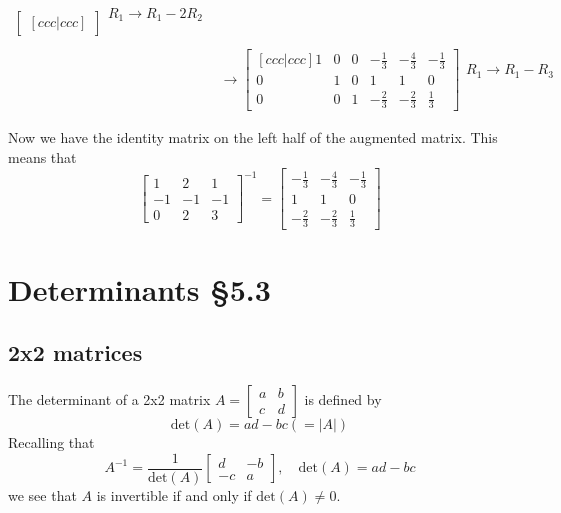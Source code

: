 \documentclass[11pt]{article}
\begin{document}
\begin{enumerate}[ (a) ]
\begin{align*}
\begin{bmatrix}[ccc|ccc]
\end{bmatrix}
\begin{matrix}
R_1 \rightarrow R_1 - 2R_2 \\
\\
\\
\end{matrix} \\
&\rightarrow
\begin{bmatrix}[ccc|ccc]
1 & 0 & 0 & -\frac{1}{3} & -\frac{4}{3} & -\frac{1}{3} \\
0 & 1 & 0 & 1 & 1 & 0\\
0 & 0 & 1 & -\frac{2}{3} & -\frac{2}{3} & \frac{1}{3}
\end{bmatrix}
\begin{matrix}
R_1 \rightarrow R_1 - R_3 \\
\\
\\
\end{matrix}
\end{align*}

Now we have the identity matrix on the left half of the augmented matrix. This means that
\[
\begin{bmatrix}
1 & 2 & 1 \\
-1 & -1 & -1\\
0 & 2 & 3
\end{bmatrix}^{-1}
=
\begin{bmatrix}
-\frac{1}{3} & -\frac{4}{3} & -\frac{1}{3} \\
1 & 1 & 0\\
-\frac{2}{3} & -\frac{2}{3} & \frac{1}{3}
\end{bmatrix}
\]
\end{enumerate}

\section{Determinants §5.3}
\subsection{2x2 matrices}
The determinant of a 2x2 matrix $\displaystyle{A = \begin{bmatrix}
a & b\\
c & d
\end{bmatrix}}$ is defined by
\[ \text{det}(A) = ad - bc (= |A|) \]
Recalling that
\[ A^{-1} = \frac{1}{\text{det}(A)} \begin{bmatrix}
d & -b\\
-c & a
\end{bmatrix},
\quad \text{det}(A) = ad -bc \]
we see that $A$ is invertible if and only if $\text{det}(A) \not = 0$.
\end{document}
